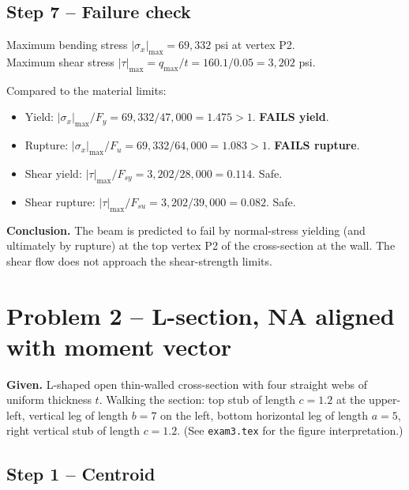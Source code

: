 \documentclass[11pt]{article}
\begin{document}
\subsection*{Step 7 -- Failure check}

Maximum bending stress $|\sigma_x|_{\max} = 69{,}332$ psi at vertex P2.\\
Maximum shear stress $|\tau|_{\max} = q_{\max}/t = 160.1 / 0.05 = 3{,}202$ psi.

Compared to the material limits:
\begin{itemize}[leftmargin=2em, itemsep=0pt]
  \item Yield: $|\sigma_x|_{\max} / F_y = 69{,}332 / 47{,}000 = 1.475 > 1$. \textbf{FAILS yield}.
  \item Rupture: $|\sigma_x|_{\max} / F_u = 69{,}332 / 64{,}000 = 1.083 > 1$. \textbf{FAILS rupture}.
  \item Shear yield: $|\tau|_{\max} / F_{sy} = 3{,}202 / 28{,}000 = 0.114$. Safe.
  \item Shear rupture: $|\tau|_{\max} / F_{su} = 3{,}202 / 39{,}000 = 0.082$. Safe.
\end{itemize}

\textbf{Conclusion.} The beam is predicted to fail by normal-stress yielding (and ultimately by rupture) at the top vertex P2 of the cross-section at the wall. The shear flow does not approach the shear-strength limits.

\section{Problem 2 -- L-section, NA aligned with moment vector}

\textbf{Given.} L-shaped open thin-walled cross-section with four straight webs of uniform thickness $t$. Walking the section: top stub of length $c = 1.2$ at the upper-left, vertical leg of length $b = 7$ on the left, bottom horizontal leg of length $a = 5$, right vertical stub of length $c = 1.2$. (See \texttt{exam3.tex} for the figure interpretation.)

\subsection*{Step 1 -- Centroid}
\end{document}
